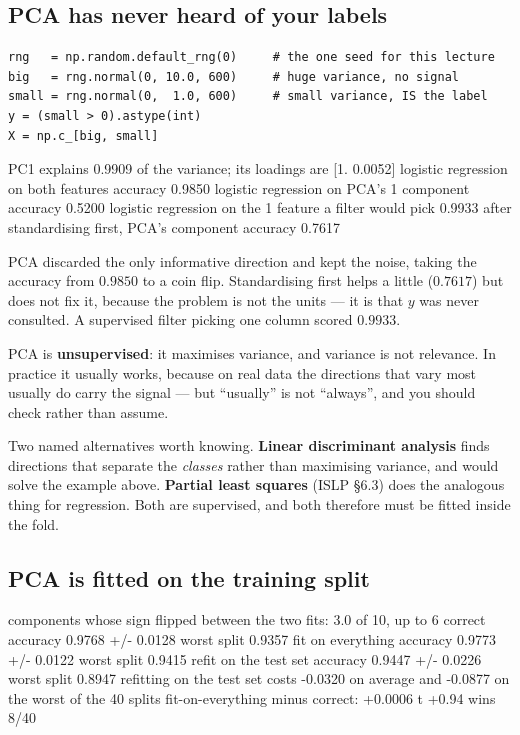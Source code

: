 \documentclass[11pt]{article}
\begin{document}
\subsection{PCA has never heard of your labels}
\label{sec:pcaunsup}

\begin{lstlisting}
rng   = np.random.default_rng(0)     # the one seed for this lecture
big   = rng.normal(0, 10.0, 600)     # huge variance, no signal
small = rng.normal(0,  1.0, 600)     # small variance, IS the label
y = (small > 0).astype(int)
X = np.c_[big, small]
\end{lstlisting}
\begin{codeout}
PC1 explains 0.9909 of the variance; its loadings are [1.     0.0052]
logistic regression on both features        accuracy 0.9850
logistic regression on PCA's 1 component    accuracy 0.5200
logistic regression on the 1 feature a filter would pick  0.9933
after standardising first, PCA's component  accuracy 0.7617
\end{codeout}

PCA discarded the only informative direction and kept the noise, taking the
accuracy from $0.9850$ to a coin flip. Standardising first helps a little
($0.7617$) but does not fix it, because the problem is not the units --- it is
that $y$ was never consulted. A supervised filter picking one column scored
$0.9933$.

\begin{keyidea}
PCA is \textbf{unsupervised}: it maximises variance, and variance is not
relevance. In practice it usually works, because on real data the directions
that vary most usually do carry the signal --- but ``usually'' is not
``always'', and you should check rather than assume.
\end{keyidea}

Two named alternatives worth knowing. \textbf{Linear discriminant analysis}
finds directions that separate the \emph{classes} rather than maximising
variance, and would solve the example above. \textbf{Partial least squares}
(ISLP \S6.3) does the analogous thing for regression. Both are supervised, and
both therefore must be fitted inside the fold.

\subsection{PCA is fitted on the training split}
\label{sec:pcaleak}

\begin{codeout}
  components whose sign flipped between the two fits: 3.0 of 10, up to 6
  correct                  accuracy 0.9768  +/- 0.0128   worst split 0.9357
  fit on everything        accuracy 0.9773  +/- 0.0122   worst split 0.9415
  refit on the test set    accuracy 0.9447  +/- 0.0226   worst split 0.8947
  refitting on the test set costs -0.0320 on average and -0.0877 on the
  worst of the 40 splits
  fit-on-everything minus correct: +0.0006  t +0.94  wins 8/40
\end{codeout}
\end{document}
